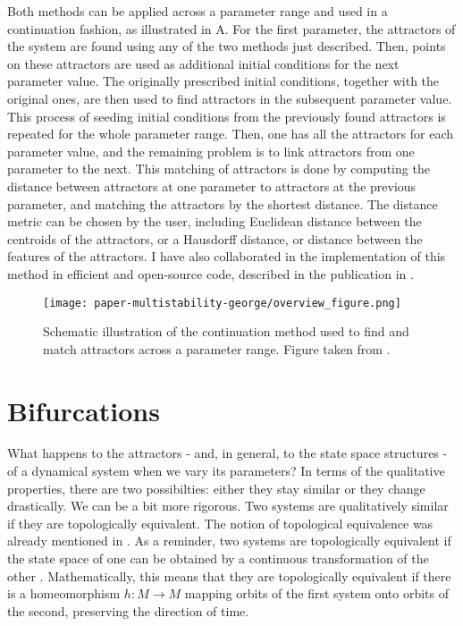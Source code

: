 Both methods can be applied across a parameter range and used in a continuation fashion, as illustrated in A. For the first parameter, the attractors of the system are found using any of the two methods just described. Then, points on these attractors are used as additional initial conditions for the next parameter value. The originally prescribed initial conditions, together with the original ones, are then used to find attractors in the subsequent parameter value. This process of seeding initial conditions from the previously found attractors is repeated for the whole parameter range. Then, one has all the attractors for each parameter value, and the remaining problem is to link attractors from one parameter to the next. This matching of attractors is done by computing the distance between attractors at one parameter to attractors at the previous parameter, and matching the attractors by the shortest distance. The distance metric can be chosen by the user, including Euclidean distance between the centroids of the attractors, or a Hausdorff distance, or distance between the features of the attractors. I have also collaborated in the implementation of this method in efficient and open-source code, described in the publication in . 
%
\begin{figure}
    \centering
    \texttt{[image: paper-multistability-george/overview\_figure.png]}
    \label{fig:method:continuation}
    \caption{Schematic illustration of the continuation method used to find and match attractors across a parameter range. Figure taken from .}
\end{figure}


\section{Bifurcations}
What happens to the attractors - and, in general, to the state space structures - of a dynamical system when we vary its parameters? In terms of the qualitative properties, there are two possibilties: either they stay similar or they change drastically. We can be a bit more rigorous. Two systems are qualitatively similar if they are topologically equivalent. The notion of topological equivalence was already mentioned in . As a reminder, two systems are topologically equivalent if the state space of one can be obtained by a continuous transformation of the other \cite{kuznetsov}. Mathematically, this means that they are topologically equivalent if there is a homeomorphism $h:M \to M$ mapping orbits of the first system onto orbits of the second, preserving the direction of time. 

